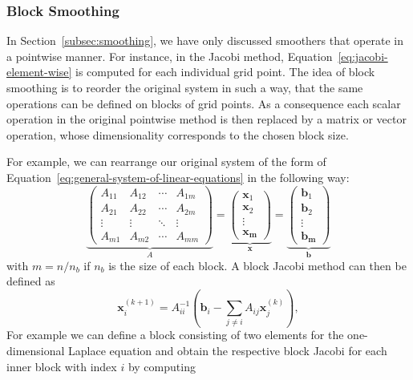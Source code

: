 \subsubsection{Block Smoothing}
In Section~\ref{subsec:smoothing}, we have only discussed smoothers that operate in a pointwise manner.
For instance, in the Jacobi method, Equation~\eqref{eq:jacobi-element-wise} is computed for each individual grid point.
The idea of block smoothing is to reorder the original system in such a way, that the same operations can be defined on blocks of grid points.
As a consequence each scalar operation in the original pointwise method is then replaced by a matrix or vector operation, whose dimensionality corresponds to the chosen block size.

For example, we can rearrange our original system of the form of Equation~\eqref{eq:general-system-of-linear-equations} in the following way:
\begin{equation}
\underbrace{
\begin{pmatrix}A_{11}&A_{12}&\cdots &A_{1m}\\A_{21}&A_{22}&\cdots &A_{2m}\\\vdots &\vdots &\ddots &\vdots \\A_{m1}&A_{m2}&\cdots &A_{mm}\end{pmatrix}}_{A}
 = 
\underbrace{
\begin{pmatrix}
\bm{x}_1 \\ \bm{x}_2 \\ \vdots \\ \bm{x_m} 
\end{pmatrix}}_{\bm{x}} =
\underbrace{
\begin{pmatrix}
	\bm{b}_1 \\ \bm{b}_2 \\ \vdots \\ \bm{b_m} 
\end{pmatrix}}_{\bm{b}}
\end{equation}
with $m = n / n_b$ if $n_b$ is the size of each block.
A block Jacobi method can then be defined as
\begin{equation}
	\bm{x}_{i}^{(k+1)}=A_{ii}^{-1}\left(\bm{b}_{i}-\sum _{j\neq i}A_{ij}\bm{x}_{j}^{(k)}\right),
	\label{eq:jacobi-block-wise}
\end{equation}
For example we can define a block consisting of two elements for the one-dimensional Laplace equation and obtain the respective block Jacobi for each inner block with index $i$ by computing
